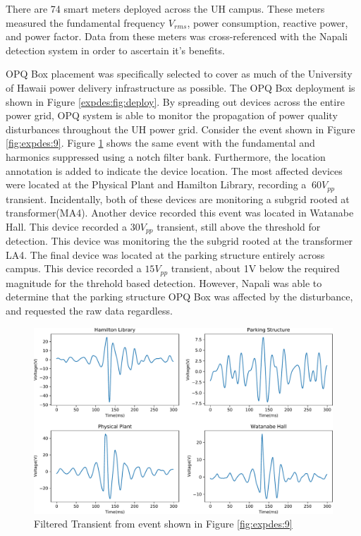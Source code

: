 There are 74 smart meters deployed across the UH campus.
These meters measured the fundamental frequency $V_{rms}$, power consumption, reactive power, and power factor.
Data from these meters was cross-referenced with the Napali detection system in order to ascertain it's benefits.

OPQ Box placement was specifically selected to cover as much of the University of Hawaii power delivery infrastructure as possible.
The OPQ Box deployment is shown in Figure \ref{expdes:fig:deploy}.
By spreading out devices across the entire power grid, OPQ system is able to monitor the propagation of power quality disturbances throughout the UH power grid.
Consider the event shown in Figure \ref{fig:expdes:9}.
Figure \ref{expdes:fig:grid_wide_filtered} shows the same event with the fundamental and harmonics suppressed using a notch filter bank.
Furthermore, the location annotation is added to indicate the device location.
The most affected devices were located at the Physical Plant and Hamilton Library, recording a $~60V_{pp}$ transient.
Incidentally, both of these devices are monitoring a subgrid rooted at transformer(MA4).
Another device recorded this event was located in Watanabe Hall.
This device recorded a $30V_{pp}$ transient, still above the threshold for detection.
This device was monitoring the the subgrid rooted at the transformer LA4.
The final device was located at the parking structure entirely across campus.
This device recorded a $15V_{pp}$ transient, about 1V below the required magnitude for the threhold based detection.
However, Napali was able to determine that the parking structure OPQ Box was affected by the disturbance, and requested the raw data regardless.

\begin{figure}[h]
    \centering
    \includegraphics[width=1\linewidth]{img/deployment/gridwide_locality.pdf}
    \caption{Filtered Transient from event shown in Figure \ref{fig:expdes:9}}
    \label{expdes:fig:grid_wide_filtered}
\end{figure}

